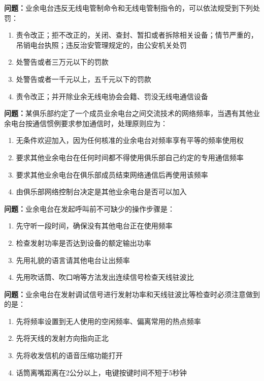 \documentclass{ctexbook}%
\begin{document}
\textbf{问题：}业余电台违反无线电管制命令和无线电管制指令的，可以依法规受到下列处罚：
\begin{enumerate}[label=\Alph*), leftmargin=3em]
\item  责令改正；拒不改正的，关闭、查封、暂扣或者拆除相关设备；情节严重的，吊销电台执照；违反治安管理规定的，由公安机关处罚
\item  处警告或者三万元以下的罚款
\item  处警告或者一千元以上，五千元以下的罚款
\item  责令改正；并开除业余无线电协会会籍、罚没无线电通信设备
\end{enumerate}

\textbf{问题：}某俱乐部约定了一个成员业余电台之间交流技术的网络频率，当遇有其他业余电台按通信惯例要求参加通信时，处理原则应为：
\begin{enumerate}[label=\Alph*), leftmargin=3em]
\item 无条件欢迎加入，因为任何核准的业余电台对频率享有平等的频率使用权
\item 要求其他业余电台在任何时间都不得使用俱乐部自己约定的专用通信频率
\item 要求其他业余电台在俱乐部成员结束网络通信后再使用该频率
\item 由俱乐部网络控制台决定是其他业余电台是否可以加入
\end{enumerate}

\textbf{问题：}业余电台在发起呼叫前不可缺少的操作步骤是：
\begin{enumerate}[label=\Alph*), leftmargin=3em]
\item 先守听一段时间，确保没有其他电台正在使用频率
\item 检查发射功率是否达到设备的额定输出功率
\item 先用礼貌的语言请其他电台让出频率
\item 先用吹话筒、吹口哨等方法发出连续信号检查天线驻波比
\end{enumerate}

\textbf{问题：}业余电台在发射调试信号进行发射功率和天线驻波比等检查时必须注意做到的是：
\begin{enumerate}[label=\Alph*), leftmargin=3em]
\item 先将频率设置到无人使用的空闲频率、偏离常用的热点频率
\item 先将天线的发射方向指向正北
\item 先将收发信机的语音压缩功能打开
\item 话筒离嘴距离在2公分以上，电键按键时间不短于5秒钟
\end{enumerate}
\end{document}
